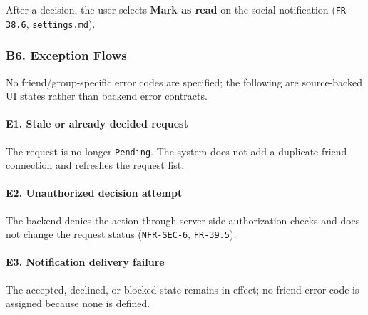 \documentclass[12pt]{article}
\begin{document}
After a decision, the user selects \textbf{Mark as read} on the social notification (\texttt{FR-38.6}, \texttt{settings.md}).
\par\medskip

\hypertarget{sec:b6-exception-flows}{}
\subsubsection*{B6. Exception Flows}
\par\medskip

No friend/group-specific error codes are specified; the following are source-backed UI states rather than backend error contracts.
\par\medskip

\hypertarget{sec:e1-stale-or-already-decided-request}{}
\paragraph*{E1. Stale or already decided request}
\par\medskip

The request is no longer \texttt{Pending}. The system does not add a duplicate friend connection and refreshes the request list.
\par\medskip

\hypertarget{sec:e2-unauthorized-decision-attempt}{}
\paragraph*{E2. Unauthorized decision attempt}
\par\medskip

The backend denies the action through server-side authorization checks and does not change the request status (\texttt{NFR-SEC-6}, \texttt{FR-39.5}).
\par\medskip

\hypertarget{sec:e3-notification-delivery-failure}{}
\paragraph*{E3. Notification delivery failure}
\par\medskip

The accepted, declined, or blocked state remains in effect; no friend error code is assigned because none is defined.
\par\medskip

\hypertarget{sec:e4-request-center-fails-to-load}{}
\end{document}

